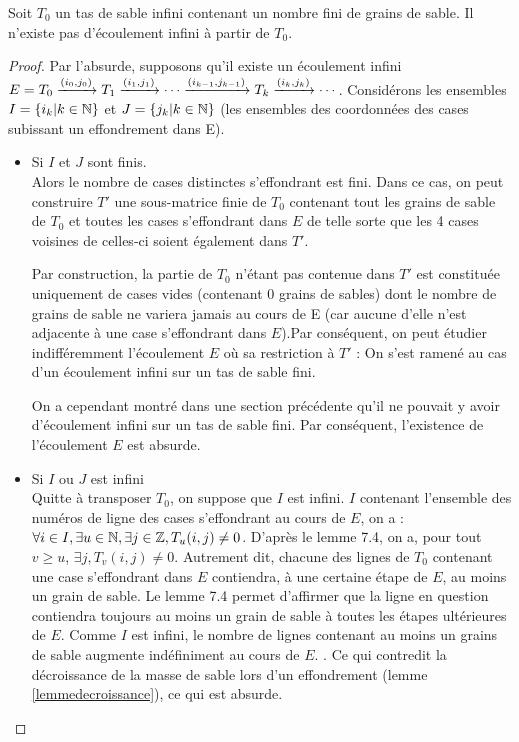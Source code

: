 \begin{theo}
Soit $T_0$ un tas de sable infini contenant un nombre fini de grains de sable. Il n'existe pas d'écoulement infini à partir de $T_0$.
\end{theo}
\begin{proof}
Par l'absurde, supposons qu'il existe un écoulement infini $E=T_0\xrightarrow{(i_{0},j_{0})}T_1\xrightarrow{(i_{1},j_{1})} \cdots \xrightarrow{(i_{k-1},j_{k-1})} T_k \xrightarrow{(i_{k},j_{k})} \cdots$. Considérons les ensembles $I=\{i_k|k\in\mathbb{N}\}$ et $J=\{j_k|k\in\mathbb{N}\}$ (les ensembles des coordonnées des cases subissant un effondrement dans E).
\begin{itemize}
\item{Si $I$ et $J$ sont finis.\\}
Alors le nombre de cases distinctes s'effondrant est fini. Dans ce cas, on peut construire $T'$ une sous-matrice finie de $T_0$ contenant tout les grains de sable de $T_0$ et toutes les cases s'effondrant dans $E$ de telle sorte que les 4 cases voisines de celles-ci soient également dans $T'$.

Par construction, la partie de $T_0$ n'étant pas contenue dans $T'$ est constituée uniquement de cases vides (contenant 0 grains de sables) dont le nombre de grains de sable ne variera jamais au cours de E (car aucune d'elle n'est adjacente à une case s'effondrant dans $E$).Par conséquent, on peut étudier indifféremment l'écoulement $E$ où sa restriction à $T'$ : On s'est ramené au cas d'un écoulement infini sur un tas de sable fini.

On a cependant montré dans une section précédente qu'il ne pouvait y avoir d'écoulement infini sur un tas de sable fini. Par conséquent, l'existence de l'écoulement $E$ est absurde.
\item{Si $I$ ou $J$ est infini\\}
Quitte à transposer $T_0$, on suppose que $I$ est infini. $I$ contenant l'ensemble des numéros de ligne des cases s'effondrant au cours de $E$, on a : $\forall i\in I,\exists u \in \mathbb{N}, \exists j \in \mathbb{Z}, T_u(i,j)\neq 0$. D'après le lemme 7.4, on a, pour tout $v\geq u$, $\exists j, T_v(i,j)\neq 0$. Autrement dit, chacune des lignes de $T_0$ contenant une case s'effondrant dans $E$ contiendra, à une certaine étape de $E$, au moins un grain de sable. Le lemme 7.4 permet d'affirmer que la ligne en question contiendra toujours au moins un grain de sable à toutes les étapes ultérieures de $E$. Comme $I$ est infini, le nombre de lignes contenant au moins un grains de sable 
augmente indéfiniment au cours de $E$.
. Ce qui contredit la décroissance de la masse de sable 
lors d'un effondrement
(lemme \ref{lemmedecroissance}), ce qui est absurde.  
\end{itemize}
\end{proof}

